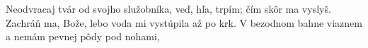Neodvracaj tvár od svojho služobníka,
veď, hľa, trpím; čím skôr ma vyslyš.
\versseparator
Zachráň ma, Bože,
lebo voda mi vystúpila až po krk.
V bezodnom bahne viaznem a nemám pevnej pôdy pod nohami,